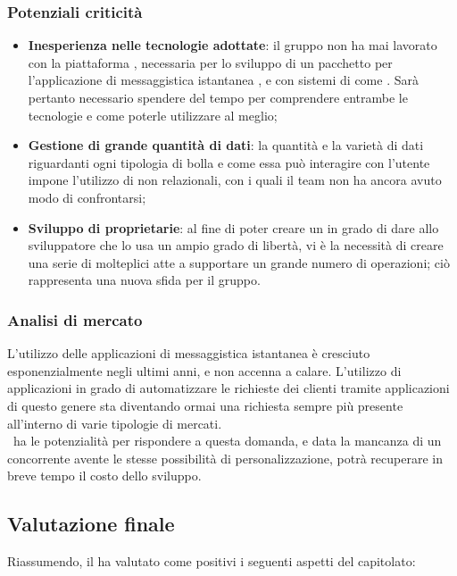 \subsubsection{Potenziali criticità}
\begin{itemize}

	\item \textbf{Inesperienza nelle tecnologie adottate}: il gruppo non ha mai lavorato con la piattaforma , necessaria per lo sviluppo di un pacchetto per l'applicazione di messaggistica istantanea , e con sistemi di  come . Sarà pertanto necessario spendere del tempo per comprendere entrambe le tecnologie e come poterle utilizzare al meglio;
	
	\item \textbf{Gestione di grande quantità di dati}: la quantità e la varietà di dati riguardanti ogni tipologia di bolla e come essa può interagire con l'utente impone l'utilizzo di  non relazionali, con i quali il team non ha ancora avuto modo di confrontarsi;
	
	\item \textbf{Sviluppo di  proprietarie}: al fine di poter creare un  in grado di dare allo sviluppatore che lo usa un ampio grado di libertà, vi è la necessità di creare una serie di molteplici  atte a supportare un grande numero di operazioni; ciò rappresenta una nuova sfida per il gruppo.

\end{itemize}

\subsubsection{Analisi di mercato}
L'utilizzo delle applicazioni di messaggistica istantanea è cresciuto esponenzialmente negli ultimi anni, e non accenna a calare. L'utilizzo di applicazioni in grado di automatizzare le richieste dei clienti tramite applicazioni di questo genere sta diventando ormai una richiesta sempre più presente all'interno di varie tipologie di mercati. \\
\progetto\ ha le potenzialità per rispondere a questa domanda, e data la mancanza di un concorrente avente le stesse possibilità di personalizzazione, potrà recuperare in breve tempo il costo dello sviluppo. 

\subsection{Valutazione finale}
Riassumendo, il  ha valutato come positivi i seguenti aspetti del capitolato:

